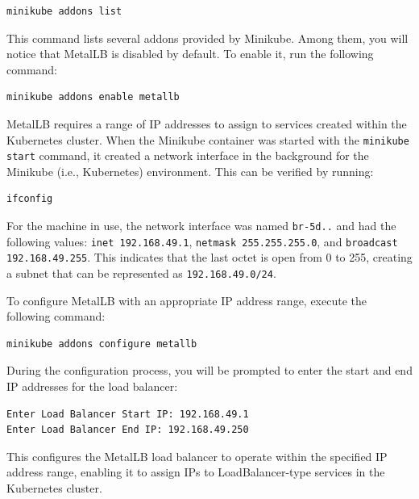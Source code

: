 \begin{lstlisting}
minikube addons list
\end{lstlisting}

This command lists several addons provided by Minikube. Among them, you will notice that MetalLB is disabled by default. To enable it, run the following command:

\begin{lstlisting}
minikube addons enable metallb
\end{lstlisting}

MetalLB requires a range of IP addresses to assign to services created within the Kubernetes cluster. When the Minikube container was started with the \texttt{minikube start} command, it created a network interface in the background for the Minikube (i.e., Kubernetes) environment. This can be verified by running:

\begin{lstlisting}
ifconfig
\end{lstlisting}

For the machine in use, the network interface was named \texttt{br-5d..} and had the following values: \texttt{inet 192.168.49.1}, \texttt{netmask 255.255.255.0}, and \texttt{broadcast 192.168.49.255}. This indicates that the last octet is open from 0 to 255, creating a subnet that can be represented as \texttt{192.168.49.0/24}.

To configure MetalLB with an appropriate IP address range, execute the following command:

\begin{lstlisting}
minikube addons configure metallb
\end{lstlisting}

During the configuration process, you will be prompted to enter the start and end IP addresses for the load balancer:

\begin{lstlisting}
Enter Load Balancer Start IP: 192.168.49.1
Enter Load Balancer End IP: 192.168.49.250
\end{lstlisting}

This configures the MetalLB load balancer to operate within the specified IP address range, enabling it to assign IPs to LoadBalancer-type services in the Kubernetes cluster.

